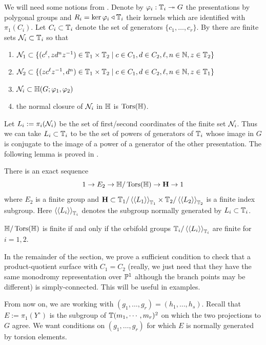 \documentclass[main.tex]{subfiles}
\begin{document}
We will need some notions from \cite{bauer:fundamental_groups}. Denote by $\varphi_i : \TT_i \onto G$ the presentations by polygonal groups and $R_i = \ker{\varphi_i} \triangleleft \TT_i$ their kernels which are identified with $\pi_1(C_i)$. Let $C_i \subset \TT_i$ denote the set of generators $\{ c_1, \dots, c_r \}$. By \cite[Lemma~4.9]{bauer:fundamental_groups} there are finite sets $\cN_i \subset \TT_i$ so that
\begin{enumerate}
    \item $\cN_1 \subset \{ (c^{\ell}, z d^n z^{-1}) \in \TT_1 \times \TT_2 \mid c \in C_1, d \in C_2, \ell,n \in \NN, z \in \TT_2 \}$
    \item $\cN_2 \subset \{ (z c^{\ell} z^{-1}, d^n) \in \TT_1 \times \TT_2 \mid c \in C_1, d \in C_2, \ell,n \in \NN, z \in \TT_1 \}$
    \item $\cN_i \subset \HH(G;\varphi_1, \varphi_2)$
    \item the normal closure of $\cN_i$ in $\HH$ is $\Tors(\HH)$.
\end{enumerate}

Let $L_i := \pi_i(\cN_i)$ be the set of first/second coordinates of the finite set $\cN_i$. Thus we can take $L_i \subset \TT_i$ to be the set of powers of generators of $\TT_i$ whose image in $G$ is conjugate to the image of a power of a generator of the other presentation. The following lemma is proved in \cite[p.25]{bauer:fundamental_groups}.

\begin{lemma}
There is an exact sequence
\[ 1 \to E_2 \to \HH / \Tors(\HH) \to \mathbf{H} \to 1 \]
where $E_2$ is a finite group and $\mathbf{H} \subset \TT_1 / \left<\left< L_1 \right>\right>_{\TT_1} \times \TT_2 / \left<\left< L_2 \right>\right>_{\TT_2}$
is a finite index subgroup. Here $\left<\left< L_i \right>\right>_{\TT_i}$ denotes the subgroup normally generated by $L_i \subset \TT_i$.
\end{lemma}

\begin{cor} \label{cor:finite_pi1}
$\HH / \Tors(\HH)$ is finite if and only if the orbifold groups $\TT_i / \left< \left< L_i \right>\right>_{\TT_i}$ are finite for $i = 1,2$.    
\end{cor}

In the remainder of the section, we prove a sufficient condition to check that a product-quotient surface with $C_1 = C_2$ (really, we just need that they have the same monodromy representation over $\P^1$ although the branch points may be different) is simply-connected. This will be useful in examples.
\par
From now on, we are working with $(g_1, \dots, g_r) = (h_1, \dots, h_s)$. Recall that $E := \pi_1(Y^\circ)$ is the subgroup of $\TT(m_1, \cdots, m_r)^2$ on which the two projections to $G$ agree. We want conditions on $(g_1, \dots, g_r)$ for which $E$ is normally generated by torsion elements.
\end{document}
